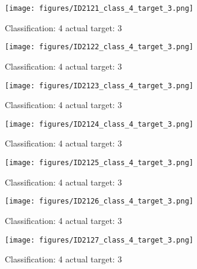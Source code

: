 \begin{figure}[h!]
\begin{center}
\texttt{[image: figures/ID2121\_class\_4\_target\_3.png]}
\end{center}
\caption{ Classification: 4 actual target: 3}
\label{fig:ID2121_class_4_target_3}
\end{figure}
\begin{figure}[h!]
\begin{center}
\texttt{[image: figures/ID2122\_class\_4\_target\_3.png]}
\end{center}
\caption{ Classification: 4 actual target: 3}
\label{fig:ID2122_class_4_target_3}
\end{figure}
\begin{figure}[h!]
\begin{center}
\texttt{[image: figures/ID2123\_class\_4\_target\_3.png]}
\end{center}
\caption{ Classification: 4 actual target: 3}
\label{fig:ID2123_class_4_target_3}
\end{figure}
\begin{figure}[h!]
\begin{center}
\texttt{[image: figures/ID2124\_class\_4\_target\_3.png]}
\end{center}
\caption{ Classification: 4 actual target: 3}
\label{fig:ID2124_class_4_target_3}
\end{figure}
\begin{figure}[h!]
\begin{center}
\texttt{[image: figures/ID2125\_class\_4\_target\_3.png]}
\end{center}
\caption{ Classification: 4 actual target: 3}
\label{fig:ID2125_class_4_target_3}
\end{figure}
\begin{figure}[h!]
\begin{center}
\texttt{[image: figures/ID2126\_class\_4\_target\_3.png]}
\end{center}
\caption{ Classification: 4 actual target: 3}
\label{fig:ID2126_class_4_target_3}
\end{figure}
\begin{figure}[h!]
\begin{center}
\texttt{[image: figures/ID2127\_class\_4\_target\_3.png]}
\end{center}
\caption{ Classification: 4 actual target: 3}
\label{fig:ID2127_class_4_target_3}
\end{figure}
